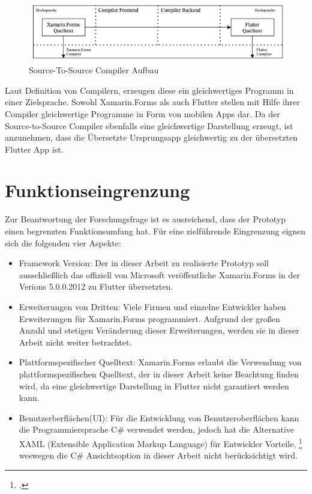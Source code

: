 \begin{figure}[!ht]
 \includegraphics[width=14.5cm]{Images/CompilerArchitecture/S2SArchitecture.png}
 \caption{Source-To-Source Compiler Aufbau}
 \label{fig:S2SCompilerAufbau}
\end{figure}

Laut Definition von Compilern,  erzeugen diese ein gleichwertiges Programm in einer Zielsprache.  Sowohl Xamarin.Forms als auch Flutter stellen mit Hilfe ihrer Compiler gleichwertige Programme in Form von mobilen Apps dar.  Da der Source-to-Source Compiler ebenfalls eine gleichwertige Darstellung erzeugt, ist anzunehmen, dass die Übersetzte Ursprungsapp gleichwertig zu der übersetzten Flutter App ist. 

\section{Funktionseingrenzung}
Zur Beantwortung der Forschungsfrage ist es ausreichend, dass der Prototyp einen begrenzten Funktionsumfang hat.  Für eine zielführende Eingrenzung eignen sich die folgenden vier Aspekte:

\begin{itemize}
\setlength\itemsep{-0.6em}
 \item Framework Version: Der in dieser Arbeit zu realisierte Prototyp soll ausschließlich das offiziell von Microsoft veröffentliche Xamarin.Forms in der Verions 5.0.0.2012 zu Flutter übersetzten.  
 \item Erweiterungen von Dritten: Viele Firmen und einzelne Entwickler haben Erweiterungen für Xamarin.Forms programmiert.  Aufgrund der großen Anzahl und stetigen Veränderung dieser Erweiterungen, werden sie in dieser Arbeit nicht weiter betrachtet.  
 \item Plattformspezifischer Quelltext: Xamarin.Forms erlaubt die Verwendung von plattformspezifischen Quelltext,  der in dieser Arbeit keine Beachtung finden wird, da eine gleichwertige Darstellung in Flutter nicht garantiert werden kann. 
  \item Benutzerberflächen(UI): Für die Entwicklung von Benutzeroberflächen kann die Programmiersprache C\# verwendet werden,  jedoch hat die Alternative XAML  (Extensible Application Markup Language) für Entwickler Vorteile, \footcite[Vgl.][Abgerufen am \today]{MicrosoftXAML2017} weswegen die C\# Ansichtsoption in dieser Arbeit nicht berücksichtigt wird.  
\end{itemize}

